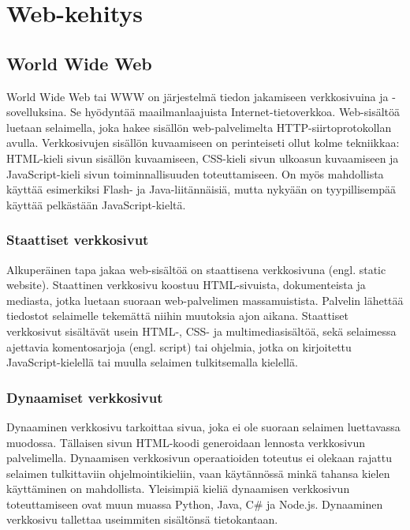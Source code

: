 \chapter{Web-kehitys}

\section{World Wide Web}
World Wide Web tai WWW on järjestelmä tiedon jakamiseen verkkosivuina ja -sovelluksina. Se hyödyntää maailmanlaajuista
Internet-tietoverkkoa. Web-sisältöä luetaan selaimella, joka hakee sisällön web-palvelimelta HTTP-siirtoprotokollan
avulla. Verkkosivujen sisällön kuvaamiseen on perinteiseti ollut kolme tekniikkaa: HTML-kieli sivun sisällön
kuvaamiseen, CSS-kieli sivun ulkoasun kuvaamiseen ja JavaScript-kieli sivun toiminnallisuuden toteuttamiseen. On myös
mahdollista käyttää esimerkiksi Flash- ja Java-liitännäisiä, mutta nykyään on tyypillisempää käyttää pelkästään
JavaScript-kieltä. \cite{javascriptguide}

\subsection{Staattiset verkkosivut}
Alkuperäinen tapa jakaa web-sisältöä on staattisena verkkosivuna (engl. static website). Staattinen verkkosivu koostuu
HTML-sivuista, dokumenteista ja mediasta, jotka luetaan suoraan web-palvelimen massamuistista. Palvelin lähettää
tiedostot selaimelle tekemättä niihin muutoksia ajon aikana. Staattiset verkkosivut sisältävät usein HTML-, CSS- ja
multimediasisältöä, sekä selaimessa ajettavia komentosarjoja (engl. script) tai ohjelmia, jotka on kirjoitettu
JavaScript-kielellä tai muulla selaimen tulkitsemalla kielellä. \cite{staticdynamicwebsites}

\subsection{Dynaamiset verkkosivut}
Dynaaminen verkkosivu tarkoittaa sivua, joka ei ole suoraan selaimen luettavassa muodossa. Tällaisen sivun HTML-koodi
generoidaan lennosta verkkosivun palvelimella. Dynaamisen verkkosivun operaatioiden toteutus ei olekaan rajattu selaimen
tulkittaviin ohjelmointikieliin, vaan käytännössä minkä tahansa kielen käyttäminen on mahdollista. Yleisimpiä kieliä
dynaamisen verkkosivun toteuttamiseen ovat muun muassa Python, Java, C\# ja Node.js. Dynaaminen verkkosivu tallettaa
useimmiten sisältönsä tietokantaan. \cite{staticdynamicwebsites}

